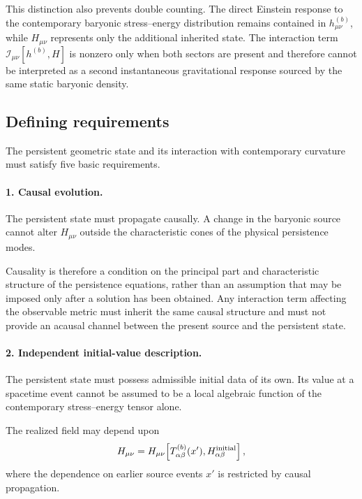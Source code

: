 This distinction also prevents double counting. The direct Einstein response to
the contemporary baryonic stress--energy distribution remains contained in
$h_{\mu\nu}^{(b)}$, while $H_{\mu\nu}$ represents only the additional inherited
state. The interaction term
$\mathcal{I}_{\mu\nu}[h^{(b)},H]$ is nonzero only when both sectors are present
and therefore cannot be interpreted as a second instantaneous gravitational
response sourced by the same static baryonic density.

\subsection{Defining requirements}
\label{subsec:persistent-state-requirements}

The persistent geometric state and its interaction with contemporary curvature
must satisfy five basic requirements.

\paragraph{1. Causal evolution.}

The persistent state must propagate causally. A change in the baryonic source
cannot alter $H_{\mu\nu}$ outside the characteristic cones of the physical
persistence modes.

Causality is therefore a condition on the principal part and characteristic
structure of the persistence equations, rather than an assumption that may be
imposed only after a solution has been obtained. Any interaction term affecting
the observable metric must inherit the same causal structure and must not
provide an acausal channel between the present source and the persistent state.

\paragraph{2. Independent initial-value description.}

The persistent state must possess admissible initial data of its own. Its value
at a spacetime event cannot be assumed to be a local algebraic function of the
contemporary stress--energy tensor alone.

The realized field may depend upon
\begin{equation}
    H_{\mu\nu}
    =
    H_{\mu\nu}
    \!\left[
        T_{\alpha\beta}^{(b)}(x'),
        H_{\alpha\beta}^{\rm initial}
    \right],
    \label{eq:persistent-history-functional-schematic}
\end{equation}
where the dependence on earlier source events $x'$ is restricted by causal
propagation.

